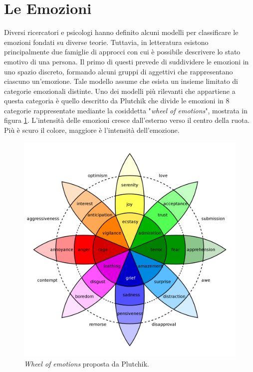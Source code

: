 \documentclass[11pt]{report}
\begin{document}



\section{Le Emozioni}


Diversi ricercatori e psicologi hanno definito alcuni modelli per classificare le emozioni fondati su diverse teorie. Tuttavia, in letteratura esistono principalmente due famiglie di approcci con cui è possibile descrivere lo stato emotivo di una persona. Il primo di questi prevede di suddividere le emozioni in uno spazio discreto, formando alcuni gruppi di aggettivi che rappresentano ciascuno un'emozione. Tale modello assume che esista un insieme limitato di categorie emozionali distinte. Uno dei modelli più rilevanti che appartiene a questa categoria è quello descritto da Plutchik\cite{plutchik2013theories} che divide le emozioni in 8 categorie rappresentate mediante la cosiddetta "\textit{wheel of emotions}", mostrata in figura \ref{fig:wheel}. L'intensità delle emozioni cresce dall'esterno verso il centro della ruota. Più è scuro il colore, maggiore è l'intensità dell'emozione.

\begin{figure}[h]
    \centering
    \includegraphics[scale = 0.15]{img/Plutchik-wheel.svg.png}
    \caption[\textit{Wheel of emotions} proposta da Plutchik.]{\textit{Wheel of emotions} proposta da Plutchik.\footnotemark}
    \label{fig:wheel}
\end{figure}
\end{document}
